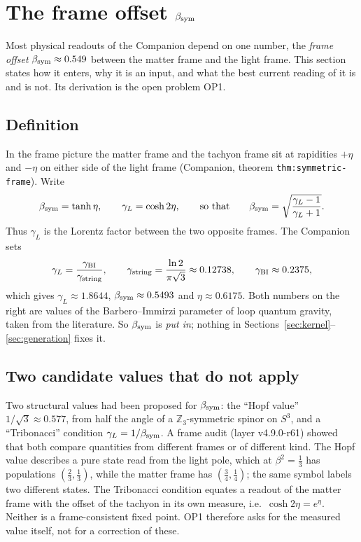 \section{The frame offset \texorpdfstring{$\beta_{\rm sym}$}{beta\_sym}}\label{sec:beta}

Most physical readouts of the Companion depend on one number, the \emph{frame offset} \(\beta_{\rm sym}\approx0.549\) between the matter
frame and the light frame.  This section states how it enters, why it is an input, and what the best current reading of it is
and is not.  Its derivation is the open problem OP1.

\subsection{Definition}

In the frame picture the matter frame and the tachyon frame sit at rapidities \(+\eta\) and \(-\eta\) on either side of the light frame
(Companion, theorem \texttt{thm:symmetric-frame}).  Write
\[
\beta_{\rm sym}=\tanh\eta,\qquad \gamma_L=\cosh2\eta,\qquad\text{so that}\qquad
\beta_{\rm sym}=\sqrt{\frac{\gamma_L-1}{\gamma_L+1}} .
\]
Thus \(\gamma_L\) is the Lorentz factor between the two opposite frames.  The Companion sets
\[
\gamma_L=\frac{\gamma_{\rm BI}}{\gamma_{\rm string}},\qquad
\gamma_{\rm string}=\frac{\ln2}{\pi\sqrt3}\approx0.12738,\qquad \gamma_{\rm BI}\approx0.2375,
\]
which gives \(\gamma_L\approx1.8644\), \(\beta_{\rm sym}\approx0.5493\) and \(\eta\approx0.6175\).  Both numbers on the right are values of the
Barbero--Immirzi parameter of loop quantum gravity, taken from the literature.  So \(\beta_{\rm sym}\) is \emph{put in}; nothing in
Sections~\ref{sec:kernel}--\ref{sec:generation} fixes it.

\subsection{Two candidate values that do not apply}

Two structural values had been proposed for \(\beta_{\rm sym}\): the ``Hopf value'' \(1/\sqrt3\approx0.577\), from half the angle of a
\(\mathbb Z_3\)-symmetric spinor on \(S^3\), and a ``Tribonacci'' condition \(\gamma_L=1/\beta_{\rm sym}\).  A frame audit (layer
v4.9.0-r61) showed that both compare quantities from different frames or of different kind.  The Hopf value describes a pure state read
from the light pole, which at \(\beta^2=\tfrac13\) has populations \((\tfrac23,\tfrac13)\), while the matter frame has \((\tfrac34,\tfrac14)\);
the same symbol labels two different states.  The Tribonacci condition equates a readout of the matter frame with the offset of the
tachyon in its own measure, i.e.\ \(\cosh2\eta=e^\eta\).  Neither is a frame-consistent fixed point.  OP1 therefore asks for the measured
value itself, not for a correction of these.

